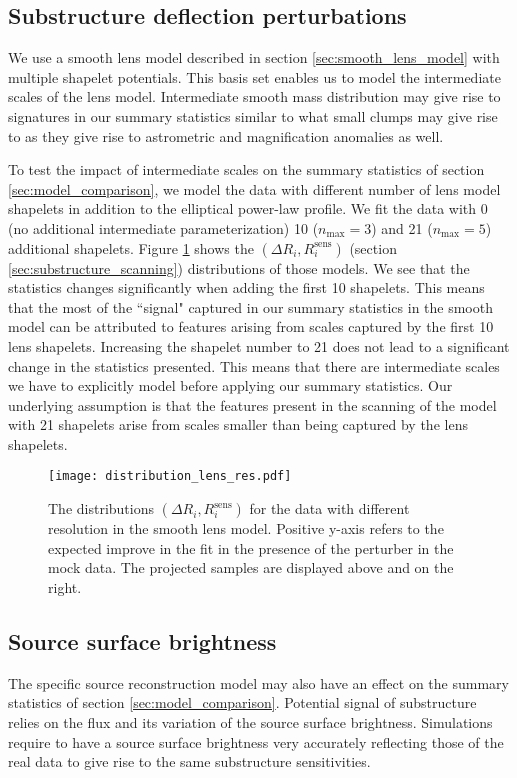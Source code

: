 \documentclass[a4paper,11pt]{article}
\begin{document}
\subsection{Substructure deflection perturbations} \label{app:sys_smooth_lens}
We use a smooth lens model described in section \ref{sec:smooth_lens_model} with multiple shapelet potentials. This basis set enables us to model the intermediate scales of the lens model. Intermediate smooth mass distribution may give rise to signatures in our summary statistics similar to what small clumps may give rise to as they give rise to astrometric and magnification anomalies as well.

To test the impact of intermediate scales on the summary statistics of section \ref{sec:model_comparison}, we model the data with different number of lens model shapelets in addition to the elliptical power-law profile. We fit the data with 0 (no additional intermediate parameterization) 10 ($n_{\text{max}}=3$) and 21 ($n_{\text{max}}=5$) additional shapelets. Figure \ref{fig:distribution_lens_res} shows the $\left(\Delta R_i, R^{\text{sens}}_i \right)$ (section \ref{sec:substructure_scanning}) distributions of those models. We see that the statistics changes significantly when adding the first 10 shapelets. This means that the most of the ``signal" captured in our summary statistics in the smooth model can be attributed to features arising from scales captured by the first 10 lens shapelets. Increasing the shapelet number to 21 does not lead to a significant change in the statistics presented. This means that there are intermediate scales we have to explicitly model before applying our summary statistics. Our underlying assumption is that the features present in the scanning of the model with 21 shapelets arise from scales smaller than being captured by the lens shapelets.

\begin{figure}
  \centering
  \texttt{[image: distribution\_lens\_res.pdf]}
  \caption{The distributions $\left(\Delta R_i, R^{\text{sens}}_i \right)$ for the data with different resolution in the smooth lens model. Positive y-axis refers to the expected improve in the fit in the presence of the perturber in the mock data. The projected samples are displayed above and on the right.}
  \label{fig:distribution_lens_res}
\end{figure}

\subsection{Source surface brightness} \label{app:sys_source_res}
The specific source reconstruction model may also have an effect on the summary statistics of section \ref{sec:model_comparison}. Potential signal of substructure relies on the flux and its variation of the source surface brightness. Simulations require to have a source surface brightness very accurately reflecting those of the real data to give rise to the same substructure sensitivities.
\end{document}
